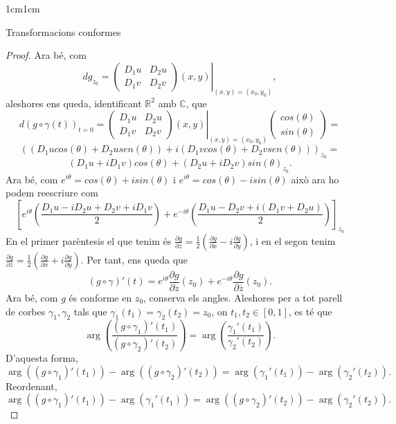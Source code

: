 \begin{adjustwidth}{1cm}{1cm}
\begin{subsection}{Transformacions conformes}
\begin{proof}
        Ara bé, com
        \[
            dg_{z_0}=\left.\begin{pmatrix}
                D_1u & D_2u\\
                D_1v & D_2v
            \end{pmatrix}(x,y)\right|_{(x,y)=(x_0,y_0)},
        \] 
        aleshores ens queda, identificant $\mathbb{R}^2$ amb $\mathbb{C}$, que 
        \[
            d(g\circ\gamma(t))_{t=0}=
            \left.\begin{pmatrix}
                D_1u & D_2u\\
                D_1v & D_2v
            \end{pmatrix}(x,y)\right|_{(x,y)=(x_0,y_0)}
            \begin{pmatrix}
                cos(\theta)\\
                sin(\theta)
            \end{pmatrix}=
        \]
        \[
            ((D_1u cos(\theta) + D_2u sen(\theta)) + i(D_1v cos(\theta) + D_2v sen(\theta)))_{z_0}=
        \]
        \[
            (D_1u+iD_1v)cos(\theta)+(D_2u+iD_2v)sin(\theta)_{z_0}.
        \]
        Ara bé, com $e^{i\theta}=cos(\theta)+isin(\theta)$ i $e^{i\theta}=cos(\theta)-isin(\theta)$ això ara ho podem reescriure com
        \[
            \left[e^{i\theta}\left(\frac{D_1u-iD_2u+D_2v+iD_1v}{2}\right)+e^{-i\theta}\left(\frac{D_1u-D_2v+i(D_1v+D_2u)}{2}\right)\right]_{z_0}
        \]
        En el primer parèntesis el que tenim és $\frac{\partial g}{\partial z}=\frac{1}{2}(\frac{\partial g}{\partial x}-i \frac{\partial g}{\partial y})$, i en el segon tenim $\frac{\partial g}{\partial \overline{z}}=\frac{1}{2}(\frac{\partial g}{\partial x}+i \frac{\partial g}{\partial y})$. Per tant, ens queda que
        \[
            (g\circ\gamma)'(t)=e^{i\theta}\frac{\partial g}{\partial z}(z_0)+e^{-i\theta}\frac{\partial g}{\partial \overline{z}}(z_0).
        \]
        Ara bé, com $g$ és conforme en $z_0$, conserva els angles. Aleshores per a tot parell de corbes $\gamma_1,\gamma_2$ tals que $\gamma_1(t_1)=\gamma_2(t_2)=z_0$, on $t_1,t_2\in[0,1]$, es té que 
        \[
            \operatorname{arg}\left(\frac{(g\circ\gamma_1)'(t_1)}{(g\circ\gamma_2)'(t_2)}\right)=\operatorname{arg}\left(\frac{\gamma_1'(t_1)}{\gamma_2'(t_2)}\right).
        \]
        D'aquesta forma, 
        \[
            \operatorname{arg}((g\circ\gamma_1)'(t_1))-\operatorname{arg}((g\circ\gamma_2)'(t_2))=\operatorname{arg}(\gamma_1'(t_1))-\operatorname{arg}(\gamma_2'(t_2)).
        \]
        Reordenant,
        \[
            \operatorname{arg}((g\circ\gamma_1)'(t_1))-\operatorname{arg}(\gamma_1'(t_1))=\operatorname{arg}((g\circ\gamma_2)'(t_2))-\operatorname{arg}(\gamma_2'(t_2)).
\]
\end{proof}
\end{subsection}
\end{adjustwidth}
